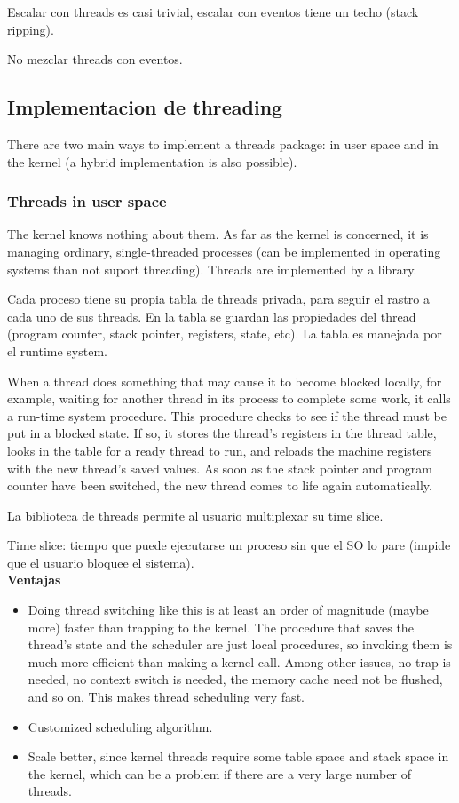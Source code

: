 \documentclass[a4paper, twoside]{article}
\begin{document}
Escalar con threads es casi trivial, escalar con eventos tiene un techo (stack ripping).

No mezclar threads con eventos.

\subsection{Implementacion de threading}
There are two main ways to implement a threads package: in user space and in the kernel (a hybrid implementation is also possible).

\subsubsection{Threads in user space}
The kernel knows nothing about them. As far as the kernel is concerned, it is managing ordinary, single-threaded processes (can be implemented in operating systems than not suport threading). Threads are implemented by a library.

Cada proceso tiene su propia tabla de threads privada, para seguir el rastro a cada uno de sus threads. En la tabla se guardan las propiedades del thread (program counter, stack pointer, registers, state, etc). La tabla es manejada por el runtime system.

When a thread does something that may cause it to become blocked locally, for example, waiting for another thread in its process to complete some work, it calls a run-time system procedure. This procedure checks to see if the thread must be put in a blocked state. If so, it stores the thread’s registers in the thread table, looks in the table for a ready thread to run, and reloads the machine registers with the new thread’s saved values. As soon as the stack pointer and program counter have been switched, the new thread comes to life again automatically.

La biblioteca de threads permite al usuario multiplexar su time slice.

Time slice: tiempo que puede ejecutarse un proceso sin que el SO lo pare (impide que el usuario bloquee el sistema).\\

\textbf{Ventajas}
\begin{itemize}
	\item Doing thread switching like this is at least an order of magnitude (maybe more) faster than trapping to the kernel. The procedure that saves the thread’s state and the scheduler are just local procedures, so invoking them is much more efficient than making a kernel call. Among other issues, no trap is needed, no context switch is needed, the memory cache need not be flushed, and so on. This makes thread scheduling very fast.
	\item Customized scheduling algorithm.
	\item Scale better, since kernel threads require some table space and stack space in the kernel, which can be a problem if there are a very large number of threads.
\end{itemize}
\end{document}
